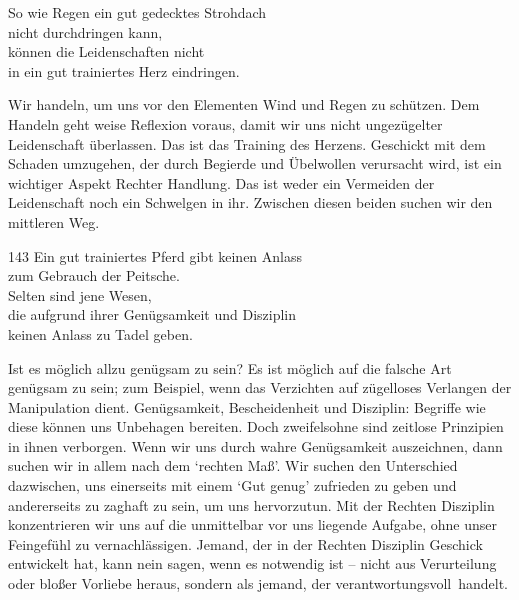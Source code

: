 
\begin{dhpVerse}{14}
\label{dhp-14}
So wie Regen ein gut gedecktes Strohdach\\ 
nicht durchdringen kann,\\ 
können die Leidenschaften nicht\\ 
in ein gut trainiertes Herz eindringen. 
\end{dhpVerse}

\begin{dhpRefl}

Wir handeln, um uns vor den Elementen Wind und Regen zu schützen. Dem Handeln
geht weise Reflexion voraus, damit wir uns nicht ungezügelter Leidenschaft
überlassen. Das ist das Training des Herzens. Geschickt mit dem Schaden
umzugehen, der durch Begierde und Übelwollen verursacht wird, ist ein
wichtiger Aspekt Rechter Handlung. Das ist weder ein Vermeiden der
Leidenschaft noch ein Schwelgen in ihr. Zwischen diesen beiden suchen wir den
mittleren Weg.

\end{dhpRefl}


\begin{dhpVerse}{143}
\label{dhp-143}
Ein gut trainiertes Pferd gibt keinen Anlass\\ 
zum Gebrauch der Peitsche.\\ 
Selten sind jene Wesen,\\ 
die aufgrund ihrer Genügsamkeit und Disziplin\\ 
keinen Anlass zu Tadel geben. 
\end{dhpVerse}

\begin{dhpRefl}

Ist es möglich allzu genügsam zu sein? Es ist möglich auf die falsche Art
genügsam zu sein; zum Beispiel, wenn das Verzichten auf zügelloses Verlangen
der Manipulation dient. Genügsamkeit, Bescheidenheit und Disziplin: Begriffe
wie diese können uns Unbehagen bereiten. Doch zweifelsohne sind zeitlose
Prinzipien in ihnen verborgen. Wenn wir uns durch wahre Genügsamkeit
auszeichnen, dann suchen wir in allem nach dem `rechten Maß'. Wir suchen den
Unterschied dazwischen, uns einerseits mit einem `Gut genug' zufrieden zu
geben und andererseits zu zaghaft zu sein, um uns hervorzutun. Mit der Rechten
Disziplin konzentrieren wir uns auf die unmittelbar vor uns liegende Aufgabe,
ohne unser Feingefühl zu vernachlässigen. Jemand, der in der Rechten Disziplin
Geschick entwickelt hat, kann nein sagen, wenn es notwendig ist -- nicht aus
Verurteilung oder bloßer Vorliebe heraus, sondern als jemand, der
\mbox{verantwortungsvoll handelt}.

\end{dhpRefl}

